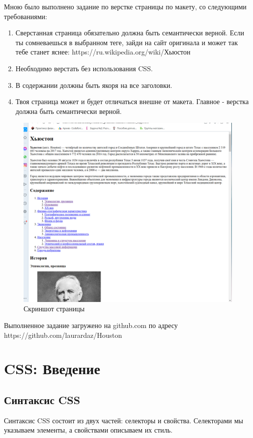 \documentclass[14pt]{extreport}
\begin{document}
Мною было выполнено задание по верстке страницы по макету, со следующими требованиями:
\begin{enumerate}
\item Сверстанная страница обязательно должна быть семантически верной. Если ты сомневаешься в выбранном теге, зайди на сайт оригинала и может так тебе станет яснее: https://ru.wikipedia.org/wiki/Хьюстон
\item Необходимо верстать без использования CSS.
\item В содержании должны быть якоря на все заголовки.
\item Твоя страница может и будет отличаться внешне от макета. Главное - верстка должна быть семантически верной.
\end{enumerate}

\begin{figure}[H]
\centerline{\includegraphics[width=0.7\linewidth]{pics_practice/houston.png}}
\caption{Скриншот страницы}
\label{}
\end{figure}

Выполненное задание загружено на github.com по адресу https://github.com/laurardaz/Houston




\chapter{CSS: Введение}
\section{Синтаксис CSS}

Синтаксис CSS состоит из двух частей: селекторы и свойства. Селекторами мы указываем элементы, а свойствами описываем их стиль.
\end{document}
